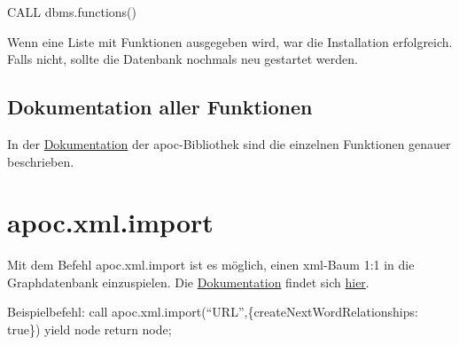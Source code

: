 \documentclass[ngerman,]{scrreprt}
\begin{document}
CALL dbms.functions()

Wenn eine Liste mit Funktionen ausgegeben wird, war die Installation erfolgreich. Falls nicht, sollte die Datenbank nochmals neu gestartet werden.

\subsection{Dokumentation aller Funktionen}\label{dokumentation-aller-funktionen}

In der \href{https://neo4j-contrib.github.io/neo4j-apoc-procedures/}{Dokumentation} der apoc-Bibliothek sind die einzelnen Funktionen genauer beschrieben.

\section{apoc.xml.import}\label{apoc.xml.import}

Mit dem Befehl apoc.xml.import ist es möglich, einen xml-Baum 1:1 in die Graphdatenbank einzuspielen. Die \href{https://neo4j-contrib.github.io/neo4j-apoc-procedures/\#_import_xml_directly}{Dokumentation} findet sich \href{https://neo4j-contrib.github.io/neo4j-apoc-procedures/\#_import_xml_directly}{hier}.

Beispielbefehl: call apoc.xml.import(``URL'',\{createNextWordRelationships: true\}) yield node return node;
\end{document}
